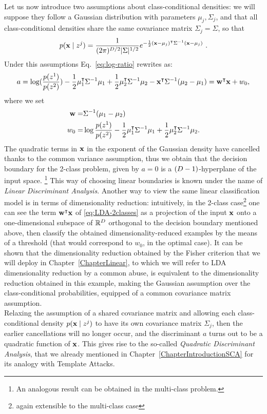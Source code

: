 Let us now introduce two assumptions about class-conditional densities: we will suppose they follow a Gaussian distribution with parameters $\mu_j, \Sigma_j$, and that all class-conditional densities share the same covariance matrix $\Sigma_j=\Sigma$, so that
\begin{equation}
p(\textbf{x}\mid z^j) = \frac{1}{(2\pi)^{{D}/2}\lvert \Sigma\rvert^{1/2}}e^{-\frac{1}{2}(\textbf{x}- \mu_j)^\intercal\Sigma^{-1}(\textbf{x}- \mu_j)} \mbox{ .}
\end{equation}
Under this assumptions Eq.~\eqref{eq:log-ratio} rewrites as: 
\begin{equation}\label{eq:LDA-2classes}
a = \log(\frac{p(z^1)}{p(z^2)}) - \frac{1}{2}\mu_1^\intercal\Sigma^{-1}\mu_1 + \frac{1}{2}\mu_2^\intercal\Sigma^{-1}\mu_2 - \textbf{x}^\intercal\Sigma^{-1}(\mu_2-\mu_1) = \textbf{w}^\intercal \textbf{x} + w_0, 
\end{equation}
where we set 
\begin{align*}
\textbf{w} =& \Sigma^{-1}(\mu_1-\mu_2)\\
w_0 =  & \log\frac{p(z^1)}{p(z^2)} - \frac{1}{2}\mu_1^\intercal\Sigma^{-1}\mu_1 + \frac{1}{2}\mu_2^\intercal\Sigma^{-1}\mu_2 . 
\end{align*}
The quadratic terms in $\textbf{x}$ in the exponent of the Gaussian density have cancelled thanks to the common variance assumption, thus we obtain that the decision boundary for the 2-class problem, given by $a=0$ is a $(D - 1)$-hyperplane of the input space. \footnote{An analogous result can be obtained in the multi-class problem.} This way of choosing linear boundaries is known under the name of \emph{Linear Discriminant Analysis}. Another way to view the same linear classification model is in terms of dimensionality reduction: intuitively, in the 2-class case\footnote{again extensible to the multi-class case} one can see the term $\textbf{w}^\intercal \textbf{x}$ of \eqref{eq:LDA-2classes} as a projection of the input $\textbf{x}$ onto a one-dimensional subspace of $\mathbb{R}^D$ orthogonal to the decision boundary mentioned above, then classify the obtained dimensionality-reduced examples by the means of a threshold (that would correspond to $w_0$, in the optimal case). It can be shown that the dimensionality reduction obtained by the Fisher criterion that we will deploy in Chapter~\ref{ChapterLinear}, to which we will refer to LDA dimensionality reduction by a common abuse, is equivalent to the dimensionality reduction obtained in this example, making the Gaussian assumption over the class-conditional probabilities, equipped of a common covariance matrix assumption.  \\
Relaxing the assumption of a shared covariance matrix and allowing each class-conditional density $p(\textbf{x}\mid z^j)$ to have its own covariance matrix $\Sigma_j$, then the earlier cancellations will no longer occur, and the discriminant $a$ turns out to be a quadratic function of $\textbf{x}$. This gives rise to the so-called \emph{Quadratic Discriminant Analysis}, that we already mentioned in Chapter~\ref{ChapterIntroductionSCA} for its analogy with Template Attacks.\\

